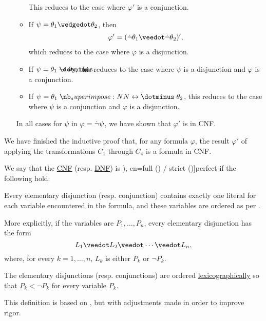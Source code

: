 \begin{defproof}
\begin{itemize}
\begin{itemize}
      This reduces to the case where \( \varphi' \) is a conjunction.

      \item If \( \psi = \theta_1 \synwedge \theta_2 \), then
      \begin{align*}
        \varphi'
        =
        (\synneg \theta_1 \synvee \synneg \theta_2)',
      \end{align*}
      which reduces to the case where \( \varphi \) is a disjunction.

      \item If \( \psi = \theta_1 \synimplies \theta_2 \), this reduces to the case where \( \psi \) is a disjunction and \( \varphi \) is a conjunction.
      \item If \( \psi = \theta_1 \syniff \theta_2 \), this reduces to the case where \( \psi \) is a conjunction and \( \varphi \) is a disjunction.
    \end{itemize}

    In all cases for \( \psi \) in \( \varphi = \dot\neg \psi \), we have shown that \( \varphi' \) is in CNF.
  \end{itemize}

  We have finished the inductive proof that, for any formula \( \varphi \), the result \( \varphi' \) of applying the transformations \( C_1 \) through \( C_4 \) is a formula in CNF.
\end{defproof}

\begin{definition}\label{def:perfect_cnf_and_dnf}\mimprovised
  We say that the \hyperref[def:cnf_and_dnf]{CNF} (resp. \hyperref[def:cnf_and_dnf]{DNF}) is \term[ru=совершенная (\cite[def. 6.3; def. 6.4]{Эдельман1975}), en=full (\cite[38]{Rosen1999}) / strict (\cite[def. 1.3.10]{Hinman2005})]{perfect} if the following hold:
  \begin{thmenum}
     Every elementary disjunction (resp. conjunction) contains exactly one literal for each variable encountered in the formula, and these variables are ordered as per .

    More explicitly, if the variables are \( P_1, \ldots, P_n \), every elementary disjunction has the form
    \begin{equation*}
      L_1 \synvee L_2 \synvee \cdots \synvee L_n,
    \end{equation*}
    where, for every \( k = 1, \ldots, n \), \( L_k \) is either \( P_k \) or \( \neg P_k \).

     The elementary disjunctions (resp. conjunctions) are ordered \hyperref[def:lexicographic_order]{lexicographically} so that \( P_k < \neg P_k \) for every variable \( P_k \).
  \end{thmenum}
\end{definition}
\begin{comments}
  \item This definition is based on \cite[def. 6.3; def. 6.4]{Эдельман1975}, but with adjustments made in order to improve rigor.
\end{comments}


